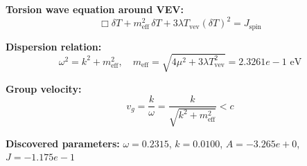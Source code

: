 
\textbf{Torsion wave equation around VEV:}
\begin{equation}
  \Box \delta T + m_{\text{eff}}^2 \, \delta T + 3\lambda T_{\text{vev}} (\delta T)^2 = J_{\text{spin}}
\end{equation}

\textbf{Dispersion relation:}
\begin{equation}
  \omega^2 = k^2 + m_{\text{eff}}^2, \quad
  m_{\text{eff}} = \sqrt{4\mu^2 + 3\lambda T_{\text{vev}}^2} = 2.3261e-1 \text{ eV}
\end{equation}

\textbf{Group velocity:}
\begin{equation}
  v_g = \frac{k}{\omega} = \frac{k}{\sqrt{k^2 + m_{\text{eff}}^2}} < c
\end{equation}

\textbf{Discovered parameters:}
$\omega = 0.2315$, \quad
$k = 0.0100$, \quad
$A = -3.265e+0$, \quad
$J = -1.175e-1$